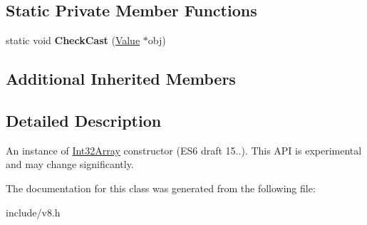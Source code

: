 \subsection*{Static Private Member Functions}
\begin{DoxyCompactItemize}
\item 
static void {\bfseries Check\+Cast} (\hyperlink{classv8_1_1_value}{Value} $\ast$obj)\hypertarget{classv8_1_1_int32_array_ab29d9e42a098d602e184deb555ba1757}{}\label{classv8_1_1_int32_array_ab29d9e42a098d602e184deb555ba1757}

\end{DoxyCompactItemize}
\subsection*{Additional Inherited Members}


\subsection{Detailed Description}
An instance of \hyperlink{classv8_1_1_int32_array}{Int32\+Array} constructor (E\+S6 draft 15..). This A\+PI is experimental and may change significantly. 

The documentation for this class was generated from the following file\+:\begin{DoxyCompactItemize}
\item 
include/v8.\+h\end{DoxyCompactItemize}
